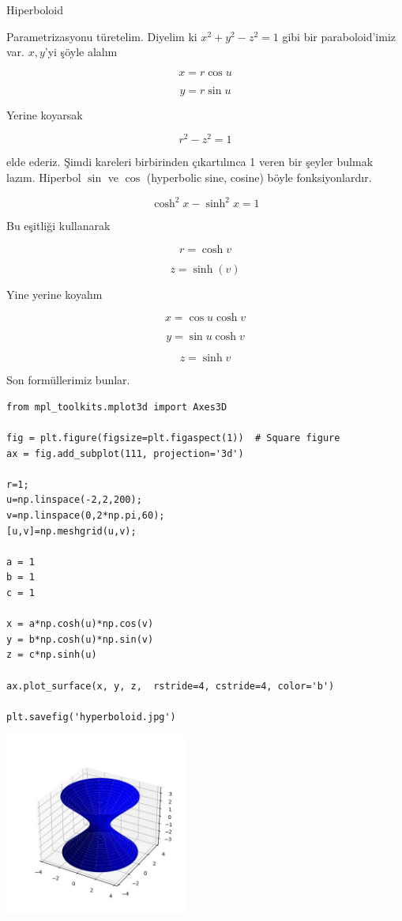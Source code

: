 \documentclass[12pt,fleqn]{article}\usepackage{../../common}
\begin{document}
Hiperboloid 

Parametrizasyonu türetelim. Diyelim ki $x^2 + y^2 - z^2 = 1$ gibi bir
paraboloid'imiz var. $x,y$'yi şöyle alalım

$$ x = r \cos u $$

$$ y = r \sin u $$

Yerine koyarsak

$$ r^2 - z^2 = 1 $$

elde ederiz. Şimdi kareleri birbirinden çıkartılınca 1 veren bir şeyler
bulmak lazım. Hiperbol $\sin$ ve $\cos$ (hyperbolic sine, cosine) böyle
fonksiyonlardır. 

$$ \cosh^2x - \sinh^2x = 1 $$

Bu eşitliği kullanarak 

$$ r = \cosh v $$

$$ z = \sinh(v) $$

Yine yerine koyalım

$$ x = \cos u \cosh v $$

$$ y = \sin u \cosh v $$

$$ z = \sinh v $$

Son formüllerimiz bunlar.

\begin{verbatim}
from mpl_toolkits.mplot3d import Axes3D

fig = plt.figure(figsize=plt.figaspect(1))  # Square figure
ax = fig.add_subplot(111, projection='3d')

r=1;
u=np.linspace(-2,2,200);
v=np.linspace(0,2*np.pi,60);
[u,v]=np.meshgrid(u,v);

a = 1
b = 1
c = 1

x = a*np.cosh(u)*np.cos(v)
y = b*np.cosh(u)*np.sin(v)
z = c*np.sinh(u)

ax.plot_surface(x, y, z,  rstride=4, cstride=4, color='b')

plt.savefig('hyperboloid.jpg')
\end{verbatim}

\includegraphics[height=6cm]{hyperboloid.jpg}
\end{document}
